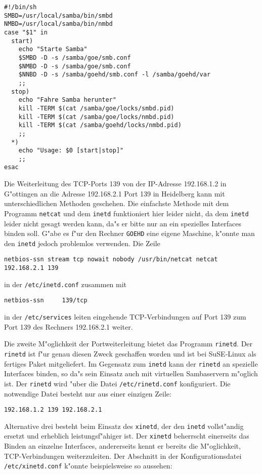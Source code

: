 \documentclass{scrartcl}\usepackage{pslatex}\typearea{12}
\newcommand{\prog}{\texttt}
\newcommand{\dateistyle}{\texttt}
\newcommand{\nbname}{\texttt}
\newcommand{\todo}[1]{}
\begin{document}
\begin{verbatim}
#!/bin/sh
SMBD=/usr/local/samba/bin/smbd
NMBD=/usr/local/samba/bin/nmbd
case "$1" in
  start)
    echo "Starte Samba"
    $SMBD -D -s /samba/goe/smb.conf
    $NMBD -D -s /samba/goe/smb.conf
    $NNBD -D -s /samba/goehd/smb.conf -l /samba/goehd/var
    ;;
  stop)
    echo "Fahre Samba herunter"
    kill -TERM $(cat /samba/goe/locks/smbd.pid)
    kill -TERM $(cat /samba/goe/locks/nmbd.pid)
    kill -TERM $(cat /samba/goehd/locks/nmbd.pid)
    ;;
  *)
    echo "Usage: $0 [start|stop]"
    ;;
esac
\end{verbatim}

Die Weiterleitung des TCP-Ports 139 von der IP-Adresse 192.168.1.2 in
G"ottingen an die Adresse 192.168.2.1 Port 139 in Heidelberg kann mit
unterschiedlichen Methoden geschehen. Die einfachste Methode mit dem
Programm \prog{netcat} und dem \prog{inetd} funktioniert hier leider
nicht, da dem \prog{inetd} leider nicht gesagt werden kann, da"s er
bitte nur an ein spezielles Interfaces binden soll. G"abe es f"ur den
Rechner \nbname{GOEHD} eine eigene Maschine, k"onnte man den
\prog{inetd} jedoch problemlos verwenden. Die Zeile

\begin{verbatim}
netbios-ssn stream tcp nowait nobody /usr/bin/netcat netcat 192.168.2.1 139
\end{verbatim}

in der \dateistyle{/etc/inetd.conf} zusammen mit

\begin{verbatim}
netbios-ssn     139/tcp
\end{verbatim}

in der \prog{/etc/services} leiten eingehende TCP-Verbindungen auf
Port 139 zum Port 139 des Rechners 192.168.2.1 weiter.

Die zweite M"oglichkeit der Portweiterleitung bietet das Programm
\prog{rinetd}. Der \prog{rinetd} ist f"ur genau diesen Zweck
geschaffen worden und ist bei SuSE-Linux als fertiges Paket
mitgeliefert. Im Gegensatz zum \prog{inetd} kann der \prog{rinetd} an
spezielle Interfaces binden, so da"s sein Einsatz auch mit virtuellen
Sambaservern m"oglich ist. Der \prog{rinetd} wird "uber die Datei
\prog{/etc/rinetd.conf} konfiguriert. Die notwendige Datei besteht nur
aus einer einzigen Zeile:

\begin{verbatim}
192.168.1.2 139 192.168.2.1
\end{verbatim}

Alternative drei besteht beim Einsatz des \prog{xinetd}, der den
\prog{inetd} vollst"andig ersetzt und erheblich leistungsf"ahiger ist.
Der \prog{xinetd} beherrscht einerseits das Binden an einzelne
Interfaces, andererseits kennt er bereits die M"oglichkeit,
TCP-Verbindungen weiterzuleiten. Der Abschnitt in der
Konfigurationsdatei \dateistyle{/etc/xinetd.conf} k"onnte
beispielsweise so aussehen\todo{CHECK}:
\end{document}
